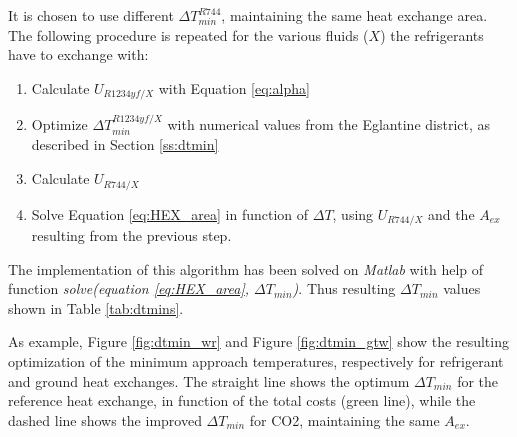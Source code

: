 \documentclass{article}
\begin{document}
It is chosen to use different $\Delta T_{min}^{R744}$, maintaining the same heat exchange area. The following procedure is repeated for the various fluids ($X$) the refrigerants have to exchange with:
\begin{enumerate}
	\item Calculate $U_{R1234yf/X}$ with Equation \ref{eq:alpha}
	\item Optimize $\Delta T_{min}^{R1234yf/X}$ with numerical values from the Eglantine district, as described in Section \ref{ss:dtmin}
	\item Calculate  $U_{R744/X}$ 
	\item Solve Equation \ref{eq:HEX_area} in function of $\Delta T$, using $U_{R744/X}$ and the $A_{ex}$ resulting from the previous step.
\end{enumerate}

The implementation of this algorithm has been solved on \textit{Matlab} with help of function \textit{solve(equation \ref{eq:HEX_area}, $\Delta T_{min}$)}.
Thus resulting $\Delta T_{min}$ values shown in Table \ref{tab:dtmins}.



As example, Figure \ref{fig:dtmin_wr} and Figure \ref{fig:dtmin_gtw} show the resulting optimization of the minimum approach temperatures, respectively for refrigerant and ground heat exchanges. The straight line shows the optimum $\Delta T_{min}$ for the reference heat exchange, in function of the total costs (green line), while the dashed line shows the improved $\Delta T_{min}$ for CO2, maintaining the same $A_{ex}$.
\end{document}
